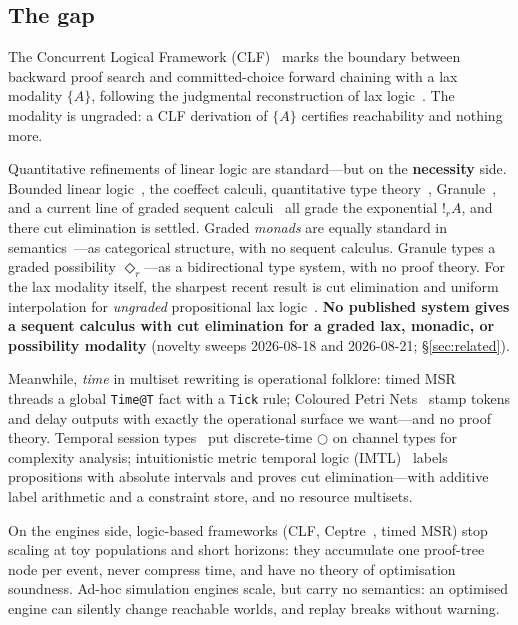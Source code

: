 \documentclass[11pt]{article}
\newcommand{\gbang}[1]{{!}_{#1}}                 %
\theoremstyle{definition}
\theoremstyle{remark}
\begin{document}
\subsection{The gap}

The Concurrent Logical Framework (CLF)~\cite{Watkins2002CLF} marks the boundary
between backward proof search and committed-choice forward chaining with a lax
modality $\{A\}$, following the judgmental reconstruction of lax
logic~\cite{FairtloughMendler1997,PfenningDavies2001}.  The modality is
ungraded: a CLF derivation of $\{A\}$ certifies reachability and nothing more.

Quantitative refinements of linear logic are standard---but on the
\textbf{necessity} side.  Bounded linear logic~\cite{GirardScedrovScott1992},
the coeffect calculi, quantitative type theory~\cite{Atkey2018},
Granule~\cite{OrchardLiepeltEades2019}, and a current line of graded sequent
calculi~\cite{MoonEadesOrchard2021,VollmerMarshallEadesOrchard2025,HanukaevEades2025}
all grade the exponential $\gbang{r} A$, and there cut elimination is settled.
Graded \emph{monads} are equally standard in
semantics~\cite{Katsumata2014,FujiiKatsumataMillies2016}---as categorical
structure, with no sequent calculus.  Granule types a graded possibility
$\Diamond_r$---as a bidirectional type system, with no proof theory.  For the lax
modality itself, the sharpest recent result is cut elimination and uniform
interpolation for \emph{ungraded} propositional lax logic~\cite{Iemhoff2024}.
\textbf{No published system gives a sequent calculus with cut elimination for a
graded lax, monadic, or possibility modality} (novelty sweeps 2026-08-18 and
2026-08-21; \S\ref{sec:related}).

Meanwhile, \emph{time} in multiset rewriting is operational folklore: timed
MSR~\cite{KanovichFORMATS2016} threads a global \texttt{Time@T} fact with a
\texttt{Tick} rule; Coloured Petri Nets~\cite{Jensen2007CPN} stamp tokens and
delay outputs with exactly the operational surface we want---and no proof theory.
Temporal session types~\cite{DasHoffmannPfenning2018} put discrete-time $\bigcirc$
on channel types for complexity analysis; intuitionistic metric temporal logic
(IMTL)~\cite{deSaToninhoPfenning2023} labels propositions with absolute intervals
and proves cut elimination---with additive label arithmetic and a constraint store,
and no resource multisets.

On the engines side, logic-based frameworks (CLF, Ceptre~\cite{Martens2015},
timed MSR) stop scaling at toy populations and short horizons: they accumulate one
proof-tree node per event, never compress time, and have no theory of
optimisation soundness.  Ad-hoc simulation engines scale, but carry no semantics:
an optimised engine can silently change reachable worlds, and replay breaks without
warning.
\end{document}

